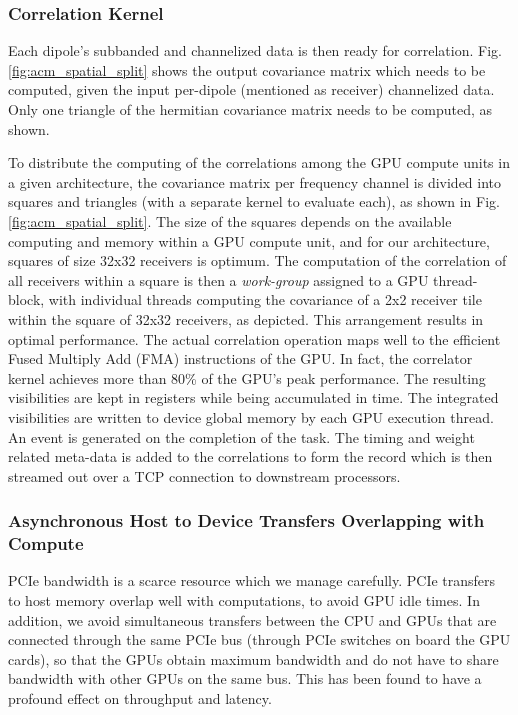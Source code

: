 \documentclass{ws-jai}
\begin{document}
\subsubsection {Correlation Kernel}
Each  dipole's subbanded  and channelized  data is  then ready  for correlation.
Fig.  \ref{fig:acm_spatial_split} shows the output covariance matrix which needs
to be computed,  given the input per-dipole (mentioned  as receiver) channelized
data. Only one triangle of the hermitian covariance matrix needs to be computed,
as shown.

To distribute the computing of the correlations among the GPU compute units in a
given architecture, the covariance matrix  per frequency channel is divided into
squares and  triangles (with a  separate kernel to  evaluate each), as  shown in
Fig.   \ref{fig:acm_spatial_split}.  The  size  of the  squares  depends on  the
available  computing  and  memory  within  a  GPU  compute  unit,  and  for  our
architecture, squares of size 32x32 receivers is optimum. The computation of the
correlation of  all receivers  within a  square is  then a  \textit {work-group}
assigned to a GPU thread-block, with individual threads computing the covariance
of a 2x2 receiver tile within the  square of 32x32 receivers, as depicted.  This
arrangement results  in optimal  performance.  The actual  correlation operation
maps well to the efficient Fused Multiply Add (FMA) instructions of the GPU.  In
fact,  the  correlator  kernel  achieves  more  than  80\%  of  the  GPU's  peak
performance.   The resulting  visibilities  are kept  in  registers while  being
accumulated in time.   The integrated visibilities are written  to device global
memory by each GPU execution thread.  An event is generated on the completion of
the task.  The timing and weight  related meta-data is added to the correlations
to  form  the record  which  is  then streamed  out  over  a TCP  connection  to
downstream processors.\\

\subsubsection  {Asynchronous  Host  to Device  Transfers  Overlapping  with  Compute}
PCIe bandwidth is a scarce resource which we manage carefully. PCIe transfers to
host  memory  overlap well  with  computations,  to  avoid  GPU idle  times.  In
addition, we  avoid simultaneous  transfers between  the CPU  and GPUs  that are
connected through  the same  PCIe bus  (through PCIe switches  on board  the GPU
cards), so  that the  GPUs obtain  maximum bandwidth  and do  not have  to share
bandwidth  with other  GPUs on  the same  bus.  This  has been  found to  have a
profound effect on throughput and latency.\\
\end{document}
